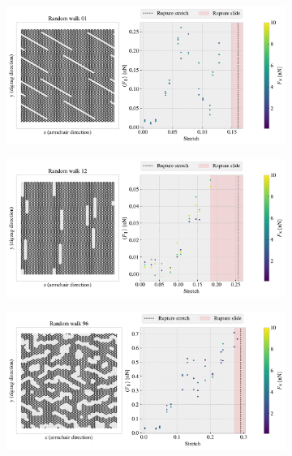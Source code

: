 \begin{figure}[H]
\begin{subfigure}[t]{0.49\textwidth}
      \caption{}
  \end{subfigure}
  \hfill
  \begin{subfigure}[t]{0.49\textwidth}
      \centering
      \includegraphics[width=\textwidth]{figures/stretch_profiles/PP_RW01.pdf}
      \caption{}
  \end{subfigure}
  \hfill
  \begin{subfigure}[t]{0.49\textwidth}
      \centering
      \includegraphics[width=\textwidth]{figures/stretch_profiles/PP_RW12.pdf}
      \caption{}
  \end{subfigure}
  \hfill
  \begin{subfigure}[t]{0.49\textwidth}
      \centering
      \includegraphics[width=\textwidth]{figures/stretch_profiles/PP_RW96.pdf}
      \caption{}
  \end{subfigure}
  \hfill
     \caption{}
     \label{fig:}
\end{figure}






